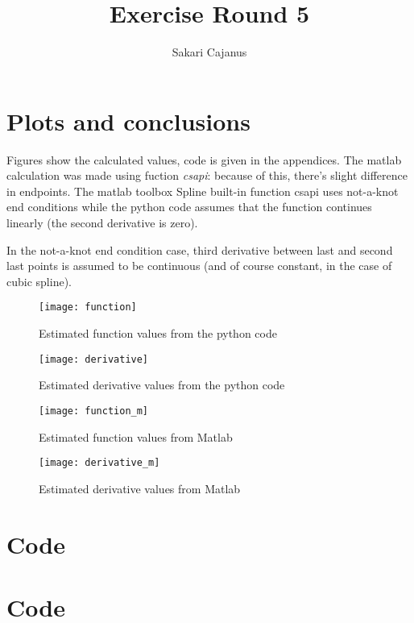 \documentclass[a4paper,12pt]{scrartcl}
\author{Sakari Cajanus}
\title{Exercise Round 5}{Och samma på English}
\begin{document}
\maketitlepage
\clearpage
{}
\addtocounter{section}{4}
\section{Plots and conclusions}
Figures show the calculated values, code is given in the appendices. The matlab calculation was made using fuction \emph{csapi}: because of this, there's slight difference in endpoints. The matlab toolbox Spline built-in function csapi uses not-a-knot end conditions while the python code assumes that the function continues linearly (the second derivative is zero).

In the not-a-knot end condition case, third derivative between last and second last points is assumed to be continuous (and of course constant, in the case of cubic spline).
\begin{figure}[h!]
  \centering
    \texttt{[image: function]}
  \caption{Estimated function values from the python code}
  \label{fig:function}
\end{figure}
\begin{figure}[h!]
  \centering
    \texttt{[image: derivative]}
  \caption{Estimated derivative values from the python code}
  \label{fig:derivative}
\end{figure}
\clearpage
\begin{figure}[h!]
  \centering
    \texttt{[image: function\_m]}
  \caption{Estimated function values from Matlab}
  \label{fig:function_m}
\end{figure}
\begin{figure}[h!]
  \centering
    \texttt{[image: derivative\_m]}
  \caption{Estimated derivative values from Matlab}
  \label{fig:derivative_m}
\end{figure}
\clearpage
\appendix
\lstset{basicstyle=\ttfamily, numbers=left, numberstyle=\tiny, stepnumber=1, numbersep=5pt}
\gdef\thesection{Appendix \arabic{section}.}
\clearpage

\section{Code\label{LiiteA}}

\clearpage
\section{Code\label{LiiteB}}

\clearpage
\end{document}

